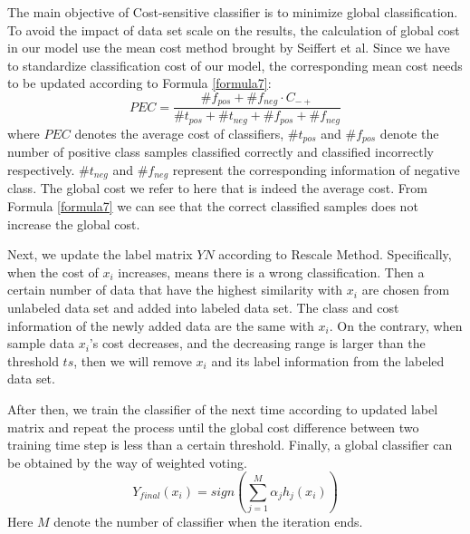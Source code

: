 \documentclass{svjour3}                     %
\begin{document}
The main objective of Cost-sensitive classifier is to minimize global classification. To avoid the
impact of data set scale on the results, the calculation of global cost in our model use the mean cost method brought by Seiffert et al\cite{seiffert2008comparative}. Since we have to standardize classification cost of our model, the corresponding mean cost needs to be updated according to Formula \ref{formula7}:
\begin{equation} \label{formula7}
  PEC=\frac{{\# {f_{pos}} + \# {f_{neg}} \cdot {C_{ -  + }}}}{{\# {t_{pos}} + \# {t_{neg}} + \# {f_{pos}} + \# {f_{neg}}}}
\end{equation}
where $PEC$ denotes the average cost of classifiers, ${\# {t_{pos}}}$ and ${\# {f_{pos}}}$  denote the number of positive class samples classified correctly and classified incorrectly respectively. ${\# {t_{neg}}}$ and ${\# {f_{neg}}}$ represent the corresponding information of negative class. The global cost we refer to here that is indeed the average cost. From Formula \ref{formula7} we can see that the correct classified samples does not increase the global cost. 

Next, we update the label matrix $YN$ according to Rescale Method. Specifically, when the cost of $x_i$ increases, means there is a wrong classification. Then a certain number of data that have the highest similarity with $x_i$ are chosen from unlabeled data set and added into labeled data set. The class and cost information of the newly added data are the same with $x_i$. On the contrary, when sample data $x_i$'s cost decreases, and the decreasing range is larger than the threshold $ts$, then we will remove $x_i$ and its label information from the labeled data set.

After then, we train the classifier of the next time according to updated label matrix and repeat the process until the global cost difference between two training time step is less than a certain
threshold. Finally, a global classifier can be obtained by the way of weighted voting.
\begin{equation}
  {Y_{final}}\left( {{x_i}} \right) = sign\left( {\mathop \sum \limits_{j = 1}^M {\alpha _j}{h_j}\left( {{x_i}} \right)} \right)
\end{equation}
Here $M$ denote the number of classifier when the iteration ends. 
\end{document}
